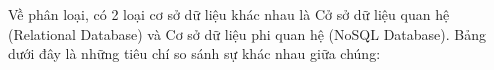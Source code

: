 Về phân loại, có 2 loại cơ sở dữ liệu khác nhau là Cở sở dữ liệu quan hệ (Relational Database) và Cơ sở dữ liệu phi quan hệ (NoSQL Database). Bảng dưới đây là những tiêu chí so sánh sự khác nhau giữa chúng:
\renewcommand{\arraystretch}{1.4}
\setlength{\tabcolsep}{5pt}
\setlength{\LTleft}{0pt}
\setlength{\LTright}{0pt}
